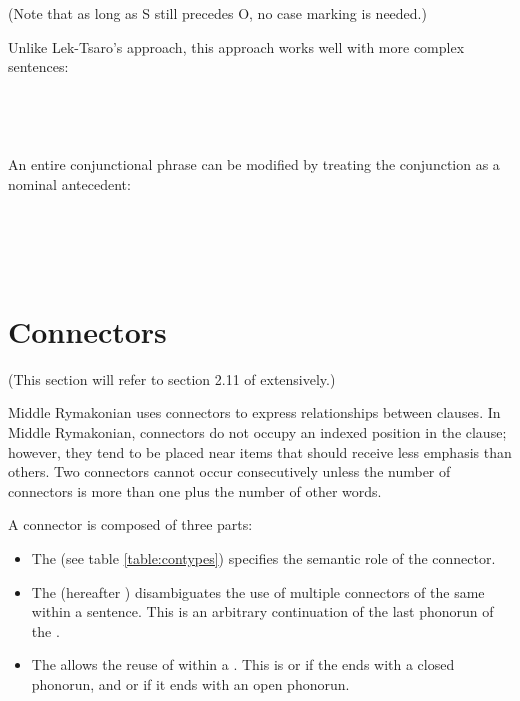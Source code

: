 \documentclass{book}
\newcommand{\lname}{Middle Rymakonian}
\begin{document}
(Note that as long as S still precedes O, no case marking is needed.)

Unlike Lek-Tsaro's approach, this approach works well with more complex sentences: \\
~\\
 \\
 \\
       \\

An entire conjunctional phrase can be modified by treating the conjunction as a nominal antecedent: \\
~\\
 \\
 \\
   \\
   

\section{Connectors}

(This section will refer to section 2.11 of  extensively.)

\lname{} uses connectors to express relationships between clauses. In \lname{}, connectors do not occupy an indexed position in the clause; however, they tend to be placed near items that should receive less emphasis than others. Two connectors cannot occur consecutively unless the number of connectors is more than one plus the number of other words.

A connector is composed of three parts:

\begin{itemize}
  \item The  (see table \ref{table:contypes}) specifies the semantic role of the connector.
  \item The  (hereafter ) disambiguates the use of multiple connectors of the same  within a sentence. This is an arbitrary continuation of the last phonorun of the .
  \item The  allows the reuse of  within a . This is  or  if the  ends with a closed phonorun, and  or  if it ends with an open phonorun.
\end{itemize}
\end{document}
